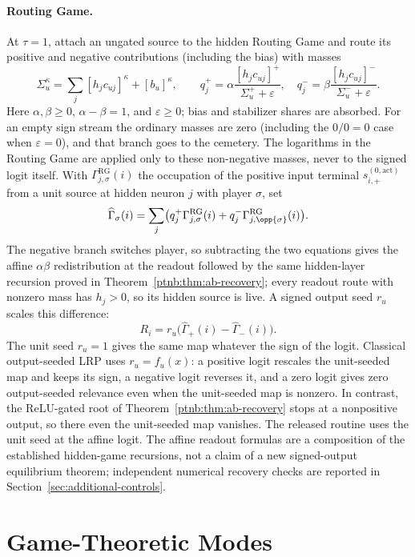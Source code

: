 \paragraph{Routing Game.}
At $\tau=1$, attach an ungated source to the hidden Routing Game and route its positive and negative
contributions (including the bias) with masses
\[
 \Sigma_u^\kappa=\sum_j[h_jc_{uj}]^\kappa+[b_u]^\kappa,
 \qquad
 q_j^+=\alpha\frac{[h_jc_{uj}]^+}{\Sigma_u^++\varepsilon},\quad
 q_j^-=\beta\frac{[h_jc_{uj}]^-}{\Sigma_u^-+\varepsilon}.
\]
Here $\alpha,\beta\geq0$, $\alpha-\beta=1$, and $\varepsilon\geq0$; bias and stabilizer shares
are absorbed. For an empty sign stream the ordinary masses are zero (including the $0/0=0$ case
when $\varepsilon=0$), and that branch goes to the cemetery. The logarithms in the Routing Game
are applied only to these non-negative masses, never to the signed logit itself. With
$\Gamma^{\mathrm{RG}}_{j,\sigma}(i)$ the occupation of the positive input terminal
$s_{i,+}^{(0,\mathrm{act})}$ from a unit source at hidden neuron $j$ with player $\sigma$, set
\[
 \widehat\Gamma_\sigma(i)=\sum_j\bigl(q_j^+\Gamma^{\mathrm{RG}}_{j,\sigma}(i)
                  +q_j^-\Gamma^{\mathrm{RG}}_{j,\opp{\sigma}}(i)\bigr).
\]
The negative branch switches player, so subtracting the two equations gives the affine
$\alpha\beta$ redistribution at the readout followed by the same hidden-layer recursion proved in
Theorem~\ref{ptnb:thm:ab-recovery}; every readout route with nonzero mass has $h_j>0$, so its
hidden source is live. A signed output seed $r_u$ scales this difference:
\begin{equation}\label{ptnb:eq:affine-readout-relevance}
 R_i=r_u\bigl(\widehat\Gamma_+(i)-\widehat\Gamma_-(i)\bigr).
\end{equation}
The unit seed $r_u=1$ gives the same map whatever the sign of the logit. Classical output-seeded
LRP uses $r_u=f_u(x)$: a positive logit rescales the unit-seeded map and keeps its sign, a negative
logit reverses it, and a zero logit gives zero output-seeded relevance even when the unit-seeded map
is nonzero. In contrast, the ReLU-gated root of Theorem~\ref{ptnb:thm:ab-recovery} stops at a
nonpositive output, so there even the unit-seeded map vanishes.
The released routine uses the unit seed at the affine logit. The affine readout formulas are a composition of
the established hidden-game recursions, not a claim of a new signed-output equilibrium theorem;
independent numerical recovery checks are reported in Section~\ref{sec:additional-controls}.

\section{Game-Theoretic Modes}\label{ptnb:sec:modes}\label{sec:risk_aversion_regularization}\label{ptnb:sec:controls}\label{ptnb:app:modes}


